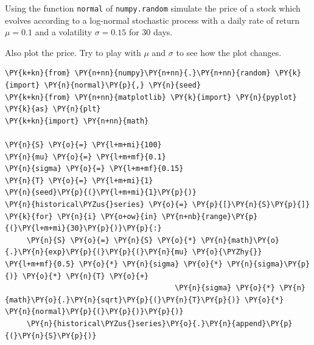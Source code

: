 \begin{Exercise}[title={(Stochastic Process Simulation)}]
Using the function \texttt{normal} of \texttt{numpy.random} simulate the price of a stock which evolves according to a log-normal stochastic process with a daily rate of return \(\mu=0.1\) and a volatility \(\sigma=0.15\) for 30 days.

Also plot the price. Try to play with \(\mu\) and \(\sigma\) to see how the plot changes.
\end{Exercise}
\vfill
\begin{Answer}
\begin{codebox}[size=fbox, boxrule=1pt, colback=cellbackground, colframe=cellborder]
\begin{Verbatim}[commandchars=\\\{\}]
\PY{k+kn}{from} \PY{n+nn}{numpy}\PY{n+nn}{.}\PY{n+nn}{random} \PY{k}{import} \PY{n}{normal}\PY{p}{,} \PY{n}{seed}
\PY{k+kn}{from} \PY{n+nn}{matplotlib} \PY{k}{import} \PY{n}{pyplot} \PY{k}{as} \PY{n}{plt}
\PY{k+kn}{import} \PY{n+nn}{math}
 
\PY{n}{S} \PY{o}{=} \PY{l+m+mi}{100}
\PY{n}{mu} \PY{o}{=} \PY{l+m+mf}{0.1}
\PY{n}{sigma} \PY{o}{=} \PY{l+m+mf}{0.15}
\PY{n}{T} \PY{o}{=} \PY{l+m+mi}{1}
\PY{n}{seed}\PY{p}{(}\PY{l+m+mi}{1}\PY{p}{)}
\PY{n}{historical\PYZus{}series} \PY{o}{=} \PY{p}{[}\PY{n}{S}\PY{p}{]}
\PY{k}{for} \PY{n}{i} \PY{o+ow}{in} \PY{n+nb}{range}\PY{p}{(}\PY{l+m+mi}{30}\PY{p}{)}\PY{p}{:}
     \PY{n}{S} \PY{o}{=} \PY{n}{S} \PY{o}{*} \PY{n}{math}\PY{o}{.}\PY{n}{exp}\PY{p}{(}\PY{p}{(}\PY{n}{mu} \PY{o}{\PYZhy{}} \PY{l+m+mf}{0.5} \PY{o}{*} \PY{n}{sigma} \PY{o}{*} \PY{n}{sigma}\PY{p}{)} \PY{o}{*} \PY{n}{T} \PY{o}{+}
                                       \PY{n}{sigma} \PY{o}{*} \PY{n}{math}\PY{o}{.}\PY{n}{sqrt}\PY{p}{(}\PY{n}{T}\PY{p}{)} \PY{o}{*} \PY{n}{normal}\PY{p}{(}\PY{p}{)}\PY{p}{)}
     \PY{n}{historical\PYZus{}series}\PY{o}{.}\PY{n}{append}\PY{p}{(}\PY{n}{S}\PY{p}{)}
     

\end{Verbatim}
\end{codebox}
\end{Answer}
